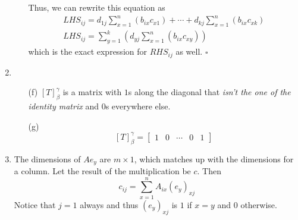 \documentclass[12pt]{article}
\begin{document}
\begin{enumerate}
\begin{enumerate}
                        Thus, we can rewrite this equation as
                        \begin{gather*}
                              LHS_{ij}=d_{1j}\sum_{x=1}^{n}(b_{ix}c_{x1}) + \cdots + d_{kj}\sum_{x=1}^{n}(b_{ix}c_{xk}) \\
                              LHS_{ij}=\sum_{y=1}^k \left(d_{yj} \sum_{x=1}^n (b_{ix}c_{xy})\right)
                        \end{gather*}
                        which is the exact expression for $RHS_{ij}$ as well. $\square$
            \end{enumerate}
      \item \begin{enumerate}
                  \item[(f)] $[T]^\gamma_\beta$ is a matrix with $1$s along the diagonal that
                        \textit{isn't the one of the identity matrix} and $0$s everywhere else.
                  \item[(g)] \[[T]^\gamma_\beta=\begin{bmatrix}
                                    1 & 0 & \cdots & 0 & 1
                              \end{bmatrix}\]
            \end{enumerate}
      \item The dimensions of $Ae_y$ are $m \times 1$, which matches up with the dimensions for a column.
            Let the result of the multiplication be $c$. Then
            \[c_{ij}=\sum_{x=1}^n A_{ix}(e_y)_{xj}\]
            Notice that $j=1$ always and thus $(e_y)_{xj}$ is $1$ if $x=y     $ and $0$ otherwise.


\end{enumerate}
\end{document}
